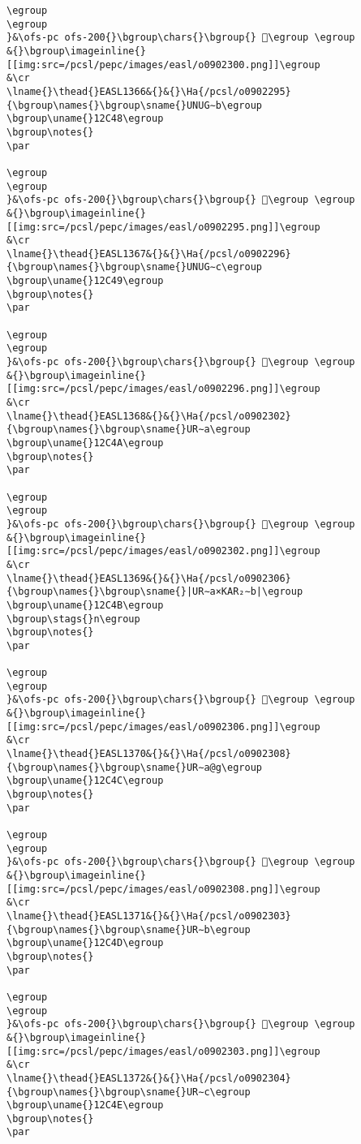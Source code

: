 \begin{verbatim}
\egroup
\egroup
}&\ofs-pc ofs-200{}\bgroup\chars{}\bgroup{} 𒱅\egroup \egroup
&{}\bgroup\imageinline{}[[img:src=/pcsl/pepc/images/easl/o0902300.png]]\egroup
&\cr
\lname{}\thead{}EASL1366&{}&{}\Ha{/pcsl/o0902295}{\bgroup\names{}\bgroup\sname{}UNUG∼b\egroup
\bgroup\uname{}12C48\egroup
\bgroup\notes{}
\par 

\egroup
\egroup
}&\ofs-pc ofs-200{}\bgroup\chars{}\bgroup{} 𒱈\egroup \egroup
&{}\bgroup\imageinline{}[[img:src=/pcsl/pepc/images/easl/o0902295.png]]\egroup
&\cr
\lname{}\thead{}EASL1367&{}&{}\Ha{/pcsl/o0902296}{\bgroup\names{}\bgroup\sname{}UNUG∼c\egroup
\bgroup\uname{}12C49\egroup
\bgroup\notes{}
\par 

\egroup
\egroup
}&\ofs-pc ofs-200{}\bgroup\chars{}\bgroup{} 𒱉\egroup \egroup
&{}\bgroup\imageinline{}[[img:src=/pcsl/pepc/images/easl/o0902296.png]]\egroup
&\cr
\lname{}\thead{}EASL1368&{}&{}\Ha{/pcsl/o0902302}{\bgroup\names{}\bgroup\sname{}UR∼a\egroup
\bgroup\uname{}12C4A\egroup
\bgroup\notes{}
\par 

\egroup
\egroup
}&\ofs-pc ofs-200{}\bgroup\chars{}\bgroup{} 𒱊\egroup \egroup
&{}\bgroup\imageinline{}[[img:src=/pcsl/pepc/images/easl/o0902302.png]]\egroup
&\cr
\lname{}\thead{}EASL1369&{}&{}\Ha{/pcsl/o0902306}{\bgroup\names{}\bgroup\sname{}|UR∼a×KAR₂∼b|\egroup
\bgroup\uname{}12C4B\egroup
\bgroup\stags{}n\egroup
\bgroup\notes{}
\par 

\egroup
\egroup
}&\ofs-pc ofs-200{}\bgroup\chars{}\bgroup{} 𒱋\egroup \egroup
&{}\bgroup\imageinline{}[[img:src=/pcsl/pepc/images/easl/o0902306.png]]\egroup
&\cr
\lname{}\thead{}EASL1370&{}&{}\Ha{/pcsl/o0902308}{\bgroup\names{}\bgroup\sname{}UR∼a@g\egroup
\bgroup\uname{}12C4C\egroup
\bgroup\notes{}
\par 

\egroup
\egroup
}&\ofs-pc ofs-200{}\bgroup\chars{}\bgroup{} 𒱌\egroup \egroup
&{}\bgroup\imageinline{}[[img:src=/pcsl/pepc/images/easl/o0902308.png]]\egroup
&\cr
\lname{}\thead{}EASL1371&{}&{}\Ha{/pcsl/o0902303}{\bgroup\names{}\bgroup\sname{}UR∼b\egroup
\bgroup\uname{}12C4D\egroup
\bgroup\notes{}
\par 

\egroup
\egroup
}&\ofs-pc ofs-200{}\bgroup\chars{}\bgroup{} 𒱍\egroup \egroup
&{}\bgroup\imageinline{}[[img:src=/pcsl/pepc/images/easl/o0902303.png]]\egroup
&\cr
\lname{}\thead{}EASL1372&{}&{}\Ha{/pcsl/o0902304}{\bgroup\names{}\bgroup\sname{}UR∼c\egroup
\bgroup\uname{}12C4E\egroup
\bgroup\notes{}
\par 


\end{verbatim}
